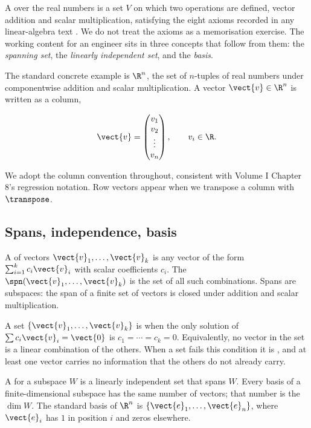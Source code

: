 A  over the real numbers is a set $V$ on which
two operations are defined, vector addition and scalar
multiplication, satisfying the eight axioms recorded in any
linear-algebra text \cite[ch.~3]{text:strang2016}. We do not treat
the axioms as a memorisation exercise. The working content for an
engineer sits in three concepts that follow from them: the
\emph{spanning set}, the \emph{linearly independent set}, and the
\emph{basis}.

The standard concrete example is $\R^{n}$, the set of $n$-tuples of
real numbers under componentwise addition and scalar multiplication.
A vector $\vect{v} \in \R^{n}$ is written as a column,

\[
\vect{v} = \begin{pmatrix} v_{1} \\ v_{2} \\ \vdots \\ v_{n}
\end{pmatrix},
\qquad v_{i} \in \R.
\]

We adopt the column convention throughout, consistent with Volume I
Chapter 8's regression notation. Row vectors appear when we transpose
a column with $\transpose$.

\subsection{Spans, independence, basis}

A  of vectors $\vect{v}_{1}, \ldots,
\vect{v}_{k}$ is any vector of the form $\sum_{i=1}^{k} c_{i}
\vect{v}_{i}$ with scalar coefficients $c_{i}$. The 
$\spn(\vect{v}_{1}, \ldots, \vect{v}_{k})$ is the set of all such
combinations. Spans are subspaces: the span of a finite set of
vectors is closed under addition and scalar multiplication.

A set $\{\vect{v}_{1}, \ldots, \vect{v}_{k}\}$ is  when the only solution of $\sum c_{i} \vect{v}_{i} =
\vect{0}$ is $c_{1} = \cdots = c_{k} = 0$. Equivalently, no vector
in the set is a linear combination of the others. When a set fails
this condition it is , and at least one
vector carries no information that the others do not already carry.

A  for a subspace $W$ is a linearly independent set
that spans $W$. Every basis of a finite-dimensional subspace has the
same number of vectors; that number is the 
$\dim W$. The standard basis of $\R^{n}$ is $\{\vect{e}_{1}, \ldots,
\vect{e}_{n}\}$, where $\vect{e}_{i}$ has $1$ in position $i$ and
zeros elsewhere.

